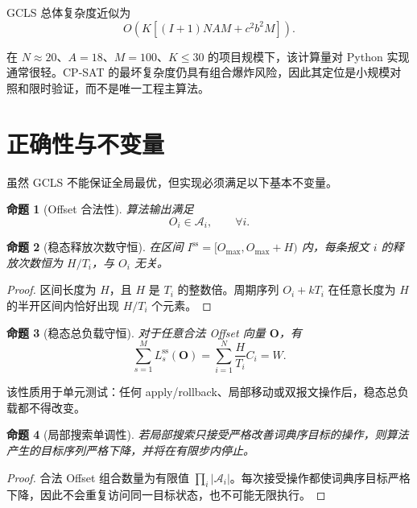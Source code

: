 \documentclass[UTF8,12pt,a4paper]{ctexart}
\newtheorem{proposition}{命题}
\newcommand{\Oset}{\mathcal{A}}
\begin{document}
GCLS 总体复杂度近似为
\begin{equation}
 O\left(K\left[(I+1)NAM+c^2b^2M\right]\right).
\end{equation}

在 $N\approx20$、$A=18$、$M=100$、$K\le30$ 的项目规模下，该计算量对 Python 实现通常很轻。CP-SAT 的最坏复杂度仍具有组合爆炸风险，因此其定位是小规模对照和限时验证，而不是唯一工程主算法。

\section{正确性与不变量}

虽然 GCLS 不能保证全局最优，但实现必须满足以下基本不变量。

\begin{proposition}[Offset 合法性]
算法输出满足
\begin{equation}
 O_i\in\Oset_i,\qquad \forall i.
\end{equation}
\end{proposition}

\begin{proposition}[稳态释放次数守恒]
在区间 $I^{\mathrm{ss}}=[O_{\max},O_{\max}+H)$ 内，每条报文 $i$ 的释放次数恒为 $H/T_i$，与 $O_i$ 无关。
\end{proposition}

\begin{proof}
区间长度为 $H$，且 $H$ 是 $T_i$ 的整数倍。周期序列 $O_i+kT_i$ 在任意长度为 $H$ 的半开区间内恰好出现 $H/T_i$ 个元素。
\end{proof}

\begin{proposition}[稳态总负载守恒]
对于任意合法 Offset 向量 $\symbf{O}$，有
\begin{equation}
 \sum_{s=1}^{M}L^{\mathrm{ss}}_s(\symbf{O})
 =\sum_{i=1}^{N}\frac{H}{T_i}C_i=W.
\end{equation}
\end{proposition}

该性质用于单元测试：任何 apply/rollback、局部移动或双报文操作后，稳态总负载都不得改变。

\begin{proposition}[局部搜索单调性]
若局部搜索只接受严格改善词典序目标的操作，则算法产生的目标序列严格下降，并将在有限步内停止。
\end{proposition}

\begin{proof}
合法 Offset 组合数量为有限值 $\prod_i|\Oset_i|$。每次接受操作都使词典序目标严格下降，因此不会重复访问同一目标状态，也不可能无限执行。
\end{proof}
\end{document}
